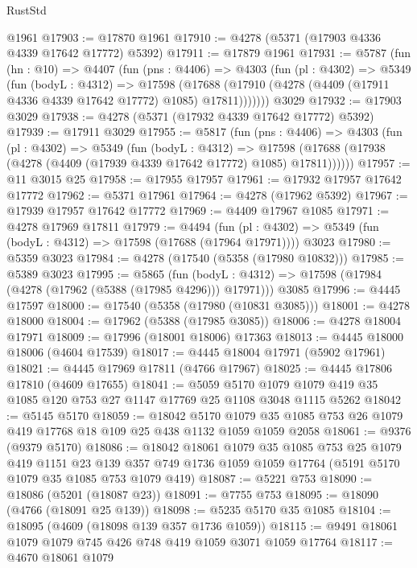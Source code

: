 \begin{lexlean}{RustStd}
\begin{coremodule}
    @1961
@17903 := @17870 @1961
@17910 := @4278 (@5371 (@17903 @4336 @4339 @17642 @17772) @5392)
@17911 := @17879 @1961
@17931 := @5787
    (fun (hn : @10) =>
    @4407
      (fun (pns : @4406) =>
      @4303
        (fun (pl : @4302) =>
        @5349
          (fun (bodyL : @4312) =>
          @17598
            (@17688 (@17910 (@4278 (@4409 (@17911 @4336 @4339 @17642 @17772) @1085) @17811)))))))
    @3029
@17932 := @17903 @3029
@17938 := @4278 (@5371 (@17932 @4339 @17642 @17772) @5392)
@17939 := @17911 @3029
@17955 := @5817
    (fun (pns : @4406) =>
    @4303
      (fun (pl : @4302) =>
      @5349
        (fun (bodyL : @4312) =>
        @17598 (@17688 (@17938 (@4278 (@4409 (@17939 @4339 @17642 @17772) @1085) @17811))))))
@17957 := @11 @3015 @25
@17958 := @17955 @17957
@17961 := @17932 @17957 @17642 @17772
@17962 := @5371 @17961
@17964 := @4278 (@17962 @5392)
@17967 := @17939 @17957 @17642 @17772
@17969 := @4409 @17967 @1085
@17971 := @4278 @17969 @17811
@17979 := @4494
    (fun (pl : @4302) => @5349 (fun (bodyL : @4312) => @17598 (@17688 (@17964 @17971))))
    @3023
@17980 := @5359 @3023
@17984 := @4278 (@17540 (@5358 (@17980 @10832)))
@17985 := @5389 @3023
@17995 := @5865
    (fun (bodyL : @4312) => @17598 (@17984 (@4278 (@17962 (@5388 (@17985 @4296))) @17971)))
    @3085
@17996 := @4445 @17597
@18000 := @17540 (@5358 (@17980 (@10831 @3085)))
@18001 := @4278 @18000
@18004 := @17962 (@5388 (@17985 @3085))
@18006 := @4278 @18004 @17971
@18009 := @17996 (@18001 @18006) @17363
@18013 := @4445 @18000 @18006 (@4604 @17539)
@18017 := @4445 @18004 @17971 (@5902 @17961)
@18021 := @4445 @17969 @17811 (@4766 @17967)
@18025 := @4445 @17806 @17810 (@4609 @17655)
@18041 := @5059
    @5170
    @1079
    @1079
    @419
    @35
    @1085
    @120
    @753
    @27
    @1147
    @17769
    @25
    @1108
    @3048
    @1115
    @5262
@18042 := @5145 @5170
@18059 := @18042
    @5170
    @1079
    @35
    @1085
    @753
    @26
    @1079
    @419
    @17768
    @18
    @109
    @25
    @438
    @1132
    @1059
    @1059
    @2058
@18061 := @9376 (@9379 @5170)
@18086 := @18042
    @18061
    @1079
    @35
    @1085
    @753
    @25
    @1079
    @419
    @1151
    @23
    @139
    @357
    @749
    @1736
    @1059
    @1059
    @17764
    (@5191 @5170 @1079 @35 @1085 @753 @1079 @419)
@18087 := @5221 @753
@18090 := @18086 (@5201 (@18087 @23))
@18091 := @7755 @753
@18095 := @18090 (@4766 (@18091 @25 @139))
@18098 := @5235 @5170 @35 @1085
@18104 := @18095 (@4609 (@18098 @139 @357 @1736 @1059))
@18115 := @9491 @18061 @1079 @1079 @745 @426 @748 @419 @1059 @3071 @1059 @17764
@18117 := @4670 @18061 @1079

\end{coremodule}
\end{lexlean}
